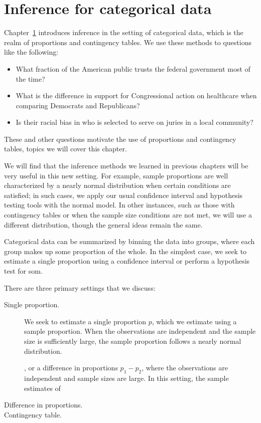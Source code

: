 
\chapter{Inference for categorical data}
\label{inferenceForCategoricalData}

Chapter~\ref{inferenceForCategoricalData} introduces inference in the setting of categorical data, which is the realm of proportions and contingency tables. We use these methods to questions like the following:
\begin{itemize}
\item What fraction of the American public trusts the federal government most of the time?
\item What is the difference in support for Congressional action on healthcare when comparing Democrats and Republicans?
\item Is their racial bias in who is selected to serve on juries in a local community?
\end{itemize}
These and other questions motivate the use of proportions and contingency tables, topics we will cover this chapter.

We will find that the inference methods we learned in previous chapters will be very useful in this new setting. For example, sample proportions are well characterized by a nearly normal distribution when certain conditions are satisfied; in such cases, we apply our usual confidence interval and hypothesis testing tools with the normal model. In other instances, such as those with contingency tables or when the sample size conditions are not met, we will use a different distribution, though the general ideas remain the same.




Categorical data can be summarized by binning the data into groups, where each group makes up some proportion of the whole. In the simplest case, we seek to estimate a single proportion using a confidence interval or perform a hypothesis test for som.

There are three primary settings that we discuss:
\begin{description}
\item[Single proportion.] We seek to estimate a single proportion $p$, which we estimate using a sample proportion. When the observations are independent and the sample size is sufficiently large, the sample proportion follows a nearly normal distribution.


, or a difference in proportions $p_1 - p_2$, where the observations are independent and sample sizes are large. In this setting, the sample estimates of 
\item[Difference in proportions.] 
\item[Contingency table.] 
\end{description}


